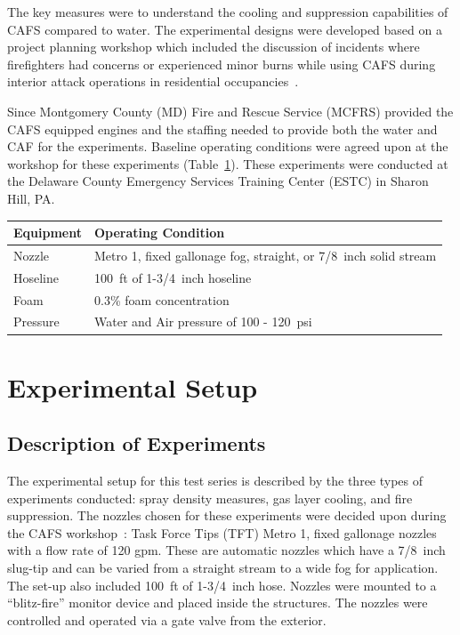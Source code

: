 \documentclass[12pt,oneside]{book}
\begin{document}
The key measures were to understand the cooling and suppression capabilities of CAFS compared to water. The experimental designs were developed based on a project planning workshop which included the discussion of incidents where firefighters had concerns or experienced minor burns while using CAFS during interior attack operations in residential occupancies~\cite{Grant:2011}.

Since Montgomery County (MD) Fire and Rescue Service (MCFRS) provided the CAFS equipped engines and the staffing needed to provide both the water and CAF for the experiments. Baseline operating conditions were agreed upon at the workshop for these experiments (Table~\ref{tab:op_condition}). These experiments were conducted at the Delaware County Emergency Services Training Center (ESTC) in Sharon Hill, PA.

\begin{table}[!ht]
\centering
{}\label{tab:op_condition}
\begin{tabular}{ll}
\toprule[1.5pt]
Equipment    &   Operating Condition \\
\midrule
Nozzle       & Metro 1, fixed gallonage fog, straight, or 7/8~inch solid stream \\
Hoseline     & 100~ft of 1-3/4~inch hoseline \\
Foam         & 0.3\% foam concentration \\
Pressure     & Water and Air pressure of 100 - 120~psi \\
\bottomrule[1.25pt]
\end{tabular}\par
\end{table}


\chapter{Experimental Setup}

\section{Description of Experiments}
\label{sec:desc_experiments}
The experimental setup for this test series is described by the three types of experiments conducted: spray density measures, gas layer cooling, and fire suppression. The nozzles chosen for these experiments were decided upon during the CAFS workshop~\cite{Grant:2011}: Task Force Tips (TFT) Metro 1, fixed gallonage nozzles with a flow rate of 120 gpm. These are automatic nozzles which have a 7/8~inch slug-tip and can be varied from a straight stream to a wide fog for application. The set-up also included 100~ft of 1-3/4~inch hose. Nozzles were mounted to a ``blitz-fire'' monitor device and placed inside the structures. The nozzles were controlled and operated via a gate valve from the exterior.
\end{document}
